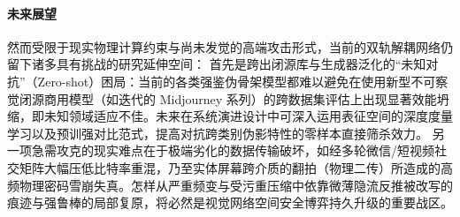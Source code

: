 \documentclass[10pt,a4paper,twocolumn]{ctexart}
\begin{document}
\paragraph{未来展望}
然而受限于现实物理计算约束与尚未发觉的高端攻击形式，当前的双轨解耦网络仍留下诸多具有挑战的研究延伸空间：
首先是跨出闭源库与生成器泛化的“未知对抗”（Zero-shot）困局：当前的各类强鉴伪骨架模型都难以避免在使用新型不可察觉闭源商用模型（如迭代的 Midjourney 系列）的跨数据集评估上出现显著效能坍缩，即未知领域适应不佳。未来在系统演进设计中可深入运用表征空间的深度度量学习以及预训强对比范式，提高对抗跨类别伪影特性的零样本直接筛杀效力。
另一项急需攻克的现实难点在于极端劣化的数据传输破坏，如经多轮微信/短视频社交矩阵大幅压低比特率重混，乃至实体屏幕跨介质的翻拍（物理二传）所造成的高频物理密码雪崩失真。怎样从严重频变与受污重压缩中依靠微薄隐流反推被改写的痕迹与强鲁棒的局部复原，将必然是视觉网络空间安全博弈持久升级的重要战区。
\end{document}
